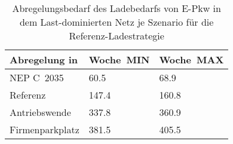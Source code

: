 {
\renewcommand{\arraystretch}{1.2}%
\begin{table}[H]
	\begin{center}
		\caption{Abregelungsbedarf des Ladebedarfs von E-Pkw in dem Last-dominierten Netz je Szenario für die Referenz-Ladestrategie}
		\begin{tabu} to 0.6\textwidth {X[1.5] X[1, r] X[1, r]}
			\toprule
			Abregelung in   \si{\mwh}    & Woche~MIN     & Woche~MAX     \\ \midrule
			NEP C~\num{2035}             & \num{60.5}  & \num{68.9}  \\
			Referenz                     & \num{147.4} & \num{160.8} \\
			Antriebswende                & \num{337.8} & \num{360.9} \\
			\glqq Firmenparkplatz\grqq{} & \num{381.5} & \num{405.5} \\ \bottomrule
		\end{tabu}
		\label{tab:load_dominated_epkw_cur}
	\end{center}
	\vspace{-3mm}%
\end{table}
}